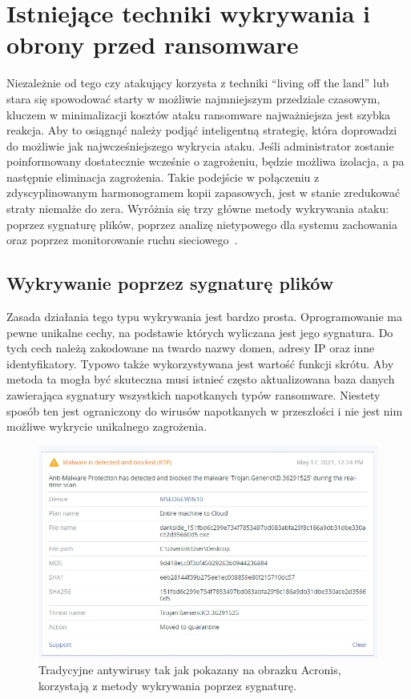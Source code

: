 \section{Istniejące techniki wykrywania i obrony przed ransomware}
Niezależnie od tego czy atakujący korzysta z techniki \foreignquote{english}{living off the land} lub stara się spowodować starty w możliwie najmniejszym przedziale czasowym, 
kluczem w minimalizacji kosztów ataku ransomware najważniejsza jest szybka reakcja. Aby to osiągnąć należy podjąć inteligentną strategię, która doprowadzi do możliwie jak najwcześniejszego wykrycia ataku.
Jeśli administrator zostanie poinformowany dostatecznie wcześnie o zagrożeniu, będzie możliwa izolacja, a pa następnie eliminacja zagrożenia. Takie podejście w połączeniu z 
zdyscyplinowanym harmonogramem kopii zapasowych, jest w stanie zredukować straty niemalże do zera.
\newline
Wyróżnia się trzy główne metody wykrywania ataku: poprzez sygnaturę plików, poprzez analizę nietypowego dla systemu zachowania oraz poprzez monitorowanie ruchu sieciowego~\cite{vehabovic_ransomware_2022}.
\subsection{Wykrywanie poprzez sygnaturę plików}
Zasada działania tego typu wykrywania jest bardzo prosta. Oprogramowanie ma pewne unikalne cechy, na podstawie których wyliczana jest jego sygnatura. Do tych cech należą zakodowane na twardo nazwy domen, adresy 
IP oraz inne identyfikatory. Typowo także wykorzystywana jest wartość funkcji skrótu. Aby metoda ta mogła być skuteczna musi istnieć często aktualizowana baza danych zawierająca sygnatury wszystkich napotkanych 
typów ransomware. Niestety sposób ten jest ograniczony do wirusów napotkanych w przeszłości i nie jest nim możliwe wykrycie unikalnego zagrożenia.
\begin{figure}[H]
    \centering
    \includegraphics[width=0.75\linewidth]{rysunki/sygnatura.png}
    \caption{Tradycyjne antywirusy tak jak pokazany na obrazku Acronis, korzystają z metody wykrywania poprzez sygnaturę.}
    \label{fig:enter-label}
\end{figure}

